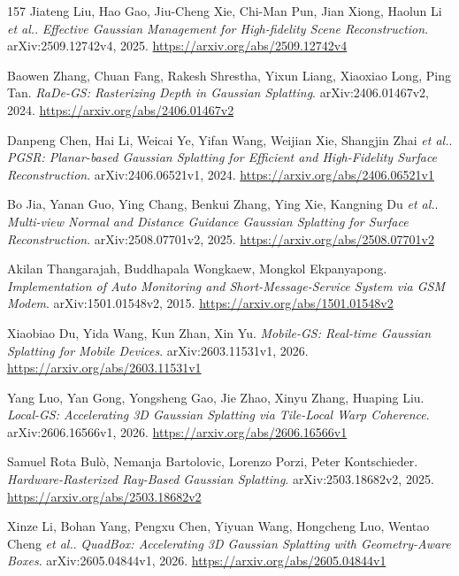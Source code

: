 \documentclass[11pt,a4paper]{article}
\begin{document}
\begin{thebibliography}{157}
Jiateng Liu, Hao Gao, Jiu-Cheng Xie, Chi-Man Pun, Jian Xiong, Haolun Li \emph{et al.}.
\newblock \emph{Effective Gaussian Management for High-fidelity Scene Reconstruction}.
\newblock arXiv:2509.12742v4, 2025.
\newblock \url{https://arxiv.org/abs/2509.12742v4}

Baowen Zhang, Chuan Fang, Rakesh Shrestha, Yixun Liang, Xiaoxiao Long, Ping Tan.
\newblock \emph{RaDe-GS: Rasterizing Depth in Gaussian Splatting}.
\newblock arXiv:2406.01467v2, 2024.
\newblock \url{https://arxiv.org/abs/2406.01467v2}

Danpeng Chen, Hai Li, Weicai Ye, Yifan Wang, Weijian Xie, Shangjin Zhai \emph{et al.}.
\newblock \emph{PGSR: Planar-based Gaussian Splatting for Efficient and High-Fidelity Surface Reconstruction}.
\newblock arXiv:2406.06521v1, 2024.
\newblock \url{https://arxiv.org/abs/2406.06521v1}

Bo Jia, Yanan Guo, Ying Chang, Benkui Zhang, Ying Xie, Kangning Du \emph{et al.}.
\newblock \emph{Multi-view Normal and Distance Guidance Gaussian Splatting for Surface Reconstruction}.
\newblock arXiv:2508.07701v2, 2025.
\newblock \url{https://arxiv.org/abs/2508.07701v2}

Akilan Thangarajah, Buddhapala Wongkaew, Mongkol Ekpanyapong.
\newblock \emph{Implementation of Auto Monitoring and Short-Message-Service System via GSM Modem}.
\newblock arXiv:1501.01548v2, 2015.
\newblock \url{https://arxiv.org/abs/1501.01548v2}

Xiaobiao Du, Yida Wang, Kun Zhan, Xin Yu.
\newblock \emph{Mobile-GS: Real-time Gaussian Splatting for Mobile Devices}.
\newblock arXiv:2603.11531v1, 2026.
\newblock \url{https://arxiv.org/abs/2603.11531v1}

Yang Luo, Yan Gong, Yongsheng Gao, Jie Zhao, Xinyu Zhang, Huaping Liu.
\newblock \emph{Local-GS: Accelerating 3D Gaussian Splatting via Tile-Local Warp Coherence}.
\newblock arXiv:2606.16566v1, 2026.
\newblock \url{https://arxiv.org/abs/2606.16566v1}

Samuel Rota Bul\`{o}, Nemanja Bartolovic, Lorenzo Porzi, Peter Kontschieder.
\newblock \emph{Hardware-Rasterized Ray-Based Gaussian Splatting}.
\newblock arXiv:2503.18682v2, 2025.
\newblock \url{https://arxiv.org/abs/2503.18682v2}

Xinze Li, Bohan Yang, Pengxu Chen, Yiyuan Wang, Hongcheng Luo, Wentao Cheng \emph{et al.}.
\newblock \emph{QuadBox: Accelerating 3D Gaussian Splatting with Geometry-Aware Boxes}.
\newblock arXiv:2605.04844v1, 2026.
\newblock \url{https://arxiv.org/abs/2605.04844v1}


\end{thebibliography}
\end{document}
